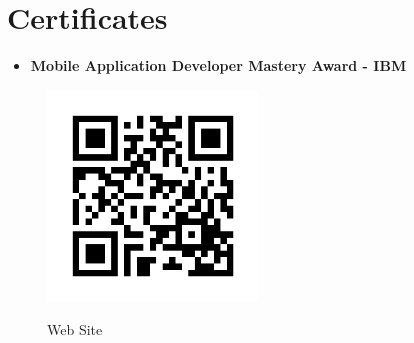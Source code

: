 \documentclass[letterpaper,11pt]{article}
\newcommand{\resumeSubHeadingListStart}{\begin{itemize}[leftmargin=*]}
\newcommand{\resumeSubHeadingListEnd}{\end{itemize}}
\begin{document}
\section{Certificates}
	\resumeSubHeadingListStart
		\item{
			\textbf{Mobile Application Developer Mastery Award - IBM}
			\hfill
		}
  \resumeSubHeadingListEnd
\newpage


\begin{figure}[h]
	\caption{Web Site}
	\centering
	\href{http://ihachani.com}{\includegraphics[width=0.5\textwidth]{home_page_qrcode}}
\end{figure}


\end{document}
